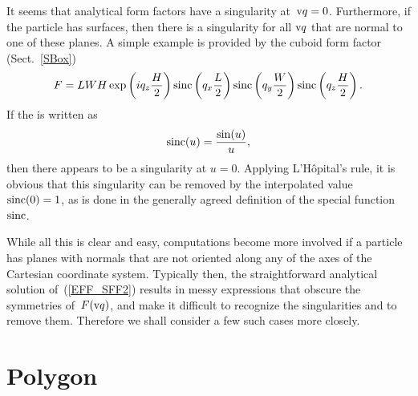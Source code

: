 %
It seems that  analytical form factors have a singularity at~$\text{v}{q}=0$.
Furthermore, if the particle has  surfaces,
then there is a singularity for all $\text{v}{q}$ that are normal to one of these planes.
A simple example is provided by the cuboid form factor (Sect.~\ref{SBox})
\begin{equation}
F= L W H\exp\left(i q_z \frac{H}{2}\right) \operatorname{sinc}\left(q_x \frac{L}{2}\right)
\operatorname{sinc}\left(q_y \frac{W}{2}\right) \operatorname{sinc}\left(q_z \frac{H}{2}\right).
\end{equation}
If the  is written as
\begin{equation}
  \operatorname{sinc}(u) = \frac{\sin(u)}{u},
\end{equation}
then there appears to be a singularity at $u=0$.
Applying L'Hôpital's rule, it is obvious
that this singularity can be removed by the interpolated value
$\operatorname{sinc}(0)=1$,
as is done in the generally agreed definition of the special function~$\operatorname{sinc}$.

While all this is clear and easy,
computations become more involved
if a particle has planes with normals that are not oriented along
any of the axes of the Cartesian coordinate system.
Typically then, the straightforward analytical solution of~(\ref{EFF_SFF2})
results in messy expressions that obscure the symmetries of~$F(\text{v}{q})$,
and make it difficult to recognize the singularities and
to remove them.
Therefore we shall consider a few such cases more closely.


\section{Polygon}\label{SFFPolygon}

\def\R{\v{R}}
\def\E{\v{E}}

